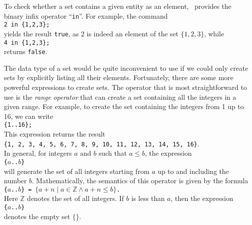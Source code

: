 To check whether a set contains a given entity as an element, \setlx\ provides the binary infix
operator ``\texttt{in}''.  For example, the command
\\[0.2cm]
\hspace*{1.3cm}
\texttt{2 in \{1,2,3\};}
\\[0.2cm]
yields the result \texttt{true}, as $2$ is indeed an element of the set $\{1,2,3\}$, while 
\\[0.2cm]
\hspace*{1.3cm}
\texttt{4 in \{1,2,3\};}
\\[0.2cm]
 returns \texttt{false}.

The data type of a set would be quite inconvenient to use if we could only create sets by
explicitly listing all their elements.  Fortunately, there are some more powerful expressions to
create sets.  The operator that is most straightforward to use is the \emph{range operator} that can create a set
containing all the integers in a given range.  For example, to create the set containing
the integers from 1 up to 16, we can write 
\\[0.2cm]
\hspace*{1.3cm}
\texttt{\{1..16\};}
\\[0.2cm]
This expression returns the result
\\[0.2cm]
\hspace*{1.3cm}
\texttt{\{1, 2, 3, 4, 5, 6, 7, 8, 9, 10, 11, 12, 13, 14, 15, 16\}}.
\\[0.2cm]
In general, for integers $a$ and $b$
such that $a \leq b$,
the expression
\\[0.2cm]
\hspace*{1.3cm}
\texttt{\{$a$..$b$\}}
\\[0.2cm]
will generate the set of all integers starting from $a$ up to and including the number
$b$.  Mathematically, the semantics of this operator is  given by the formula
\\[0.2cm]
\hspace*{1.3cm}
\texttt{\{$a$..$b$\} = $\{ a + n \mid a \in \mathbb{Z} \wedge a + n \leq b\}$.}
\\[0.2cm]
Here $\mathbb{Z}$ denotes the set of all integers.
If $b$ is less than $a$, then the expression 
\\[0.2cm]
\hspace*{1.3cm}
\texttt{\{$a$..$b$\}}
\\[0.2cm]
denotes the empty set $\{\}$.

